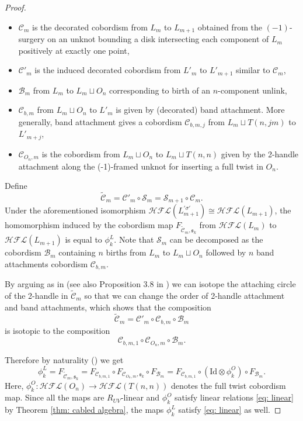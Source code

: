 \documentclass[10pt,a4paper]{amsart}
\theoremstyle{plain}
\newcommand{\cHFL}{\mathcal{H\!F\! L}}
\newcommand{\Id}{\mathrm{Id}}
\newcommand{\s}{\mathfrak{s}}
\begin{document}
\begin{proof}
\begin{itemize}
\item $\mathcal{C}_{m}$ is the decorated cobordism from $L_m$ to $L_{m+1}$ obtained from the $(-1)$-surgery on an unknot bounding a disk intersecting each component of $L_m$ positively at exactly one point,
\item $\mathcal{C}'_m$ is the induced decorated cobordism from $L'_{m}$ to $L'_{m+1}$ similar to $\mathcal{C}_m$,
\item $\mathcal{B}_m$ from $L_{m}$ to $L_{m}\sqcup O_n$ corresponding to birth of an $n$-component unlink,
\item $\mathcal{C}_{b,m}$ from $L_{m}\sqcup O_n$ to $L'_{m}$ is given by (decorated) band attachment. More generally, band attachment gives a cobordism
$\mathcal{C}_{b,m,j}$ from $L_{m}\sqcup T(n,jm)$ to $L'_{m+j}$,
\item $\mathcal{C}_{O_n,m}$  is the cobordism from $L_{m}\sqcup O_n$ to $L_{m}\sqcup T(n,n)$ given by the 2-handle attachment along the (-1)-framed unknot for inserting a full twist in $O_n$.
\end{itemize}

Define
$$\tilde{\mathcal{C}}_m=\mathcal{C}'_m\circ \mathcal{S}_m=\mathcal{S}_{m+1} \circ \mathcal{C}_m.$$
Under the aforementioned isomorphism $\cHFL(L_{m+1}^{'\sigma'})\cong \cHFL(L_{m+1})$, the homomorphism induced by the cobordism map $F_{\tilde{\mathcal{C}}_m, \s_k}$
 from $\cHFL(L_{m})$ to $\cHFL(L_{m+1})$ is equal to $\phi^{L}_k$. Note that $\mathcal{S}_m$ can be decomposed as the cobordism $\mathcal{B}_m$ containing $n$ births from $L_{m}$ to $L_{ m}\sqcup O_n$ followed by $n$ band attachments cobordism $\mathcal{C}_{b,m}$. 

By arguing as in \cite[Proposition 3.13]{AGL} (see also Proposition 3.8 in \cite{AGL}) we can isotope the attaching circle of the 2-handle in $\tilde{\mathcal{C}}_m$ so that we can
change the order of 2-handle attachment and band attachments, which shows that the composition
$$
\tilde{\mathcal{C}}_m=\mathcal{C}'_{m}\circ \mathcal{C}_{b,m}\circ \mathcal{B}_{m}
$$
is isotopic to the composition
$$
\mathcal{C}_{b,m,1}\circ \mathcal{C}_{O_n,m}\circ \mathcal{B}_{m}.
$$

Therefore by naturality (\cite{Zemke}) we get
$$
\phi_k^{L}=F_{\tilde{\mathcal{C}}_m, \s_k}=F_{\mathcal{C}_{b,m,1}}\circ F_{\mathcal{C}_{O_n,m},\mathfrak{s}_k}\circ F_{\mathcal{B}_{m}}=F_{\mathcal{C}_{b,m,1}}\circ \left(\Id\otimes \phi_k^{O}\right)\circ F_{\mathcal{B}_{m}}.
$$
Here, $\phi_k^{O}: \cHFL(O_{n})\rightarrow \cHFL(T(n,n))$ denotes the full twist cobordism map. Since all the maps are $R_{UV}$-linear and  $\phi_k^{O}$ satisfy linear relations \eqref{eq: linear} by Theorem \ref{thm: cabled algebra}, the maps $\phi_k^{L}$ satisfy \eqref{eq: linear} as well. 


\end{proof}
\end{document}
